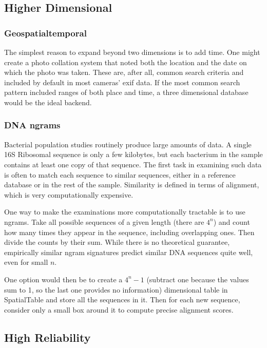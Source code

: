 \documentclass[11pt]{article}
\begin{document}
\subsection{Higher Dimensional}

\subsubsection{Geospatialtemporal}

The simplest reason to expand beyond two dimensions is to add time.  One might create a photo collation system that noted both the location and the date on which the photo was taken.  These are, after all, common search criteria and included by default in most cameras' exif data.  If the most common search pattern included ranges of both place and time, a three dimensional database would be the ideal backend. 

\subsubsection{DNA ngrams}

Bacterial population studies routinely produce large amounts of data.  A single 16S Ribosomal sequence is only a few kilobytes, but each bacterium in the sample contains at least one copy of that sequence.  The first task in examining such data is often to match each sequence to similar sequences, either in a reference database or in the rest of the sample.  Similarity is defined in terms of alignment, which is very computationally expensive.

One way to make the examinations more computationally tractable is to use ngrams.  Take all possible sequences of a given length (there are $4^n$) and count how many times they appear in the sequence, including overlapping ones.  Then divide the counts by their sum.  While there is no theoretical guarantee, empirically similar ngram signatures predict similar DNA sequences quite well, even for small $n$.\cite{dna}

One option would then be to create a $4^n-1$ (subtract one because the values sum to 1, so the last one provides no information) dimensional table in SpatialTable and store all the sequences in it.  Then for each new sequence, consider only a small box around it to compute precise alignment scores.

\subsection{High Reliability}
\end{document}
